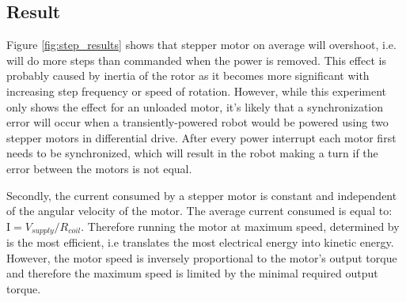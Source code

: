\subsection{Result}

Figure \ref{fig:step_results} shows that stepper motor on average will overshoot, i.e. will do more steps than commanded when the power is removed.
This effect is probably caused by inertia of the rotor as it becomes more significant with increasing step frequency or speed of rotation.
However, while this experiment only shows the effect for an unloaded motor, it's likely that a synchronization error will occur when a transiently-powered robot would be powered using two stepper motors in differential drive.
After every power interrupt each motor first needs to be synchronized, which will result in the robot making a turn if the error between the motors is not equal.

Secondly, the current consumed by a stepper motor is constant and independent of the angular velocity of the motor.
The average current consumed is equal to: $\textrm{I} = V_{supply}/R_{coil}$.
Therefore running the motor at maximum speed, determined by is the most efficient, i.e translates the most electrical energy into kinetic energy.
However, the motor speed is inversely proportional to the motor's output torque and therefore the maximum speed is limited by the minimal required output torque.





